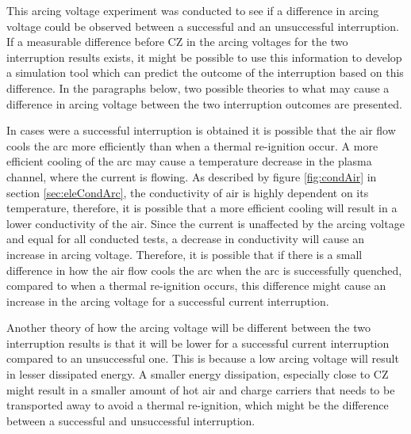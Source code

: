 \documentclass[10pt,b5paper,twoside]{article}
\begin{document}
This arcing voltage experiment was conducted to see if a difference in arcing voltage could be observed between a successful and an unsuccessful interruption. If a measurable difference before CZ in the arcing voltages for the two interruption results exists, it might be possible to use this information to develop a simulation tool which can predict the outcome of the interruption based on this difference. In the paragraphs below, two possible theories to what may cause a difference in arcing voltage between the two interruption outcomes are presented.

In cases were a successful interruption is obtained it is possible that the air flow cools the arc more efficiently than when a thermal re-ignition occur. A more efficient cooling of the arc may cause a temperature decrease in the plasma channel, where the current is flowing. As described by figure \ref{fig:condAir} in section \ref{sec:eleCondArc}, the conductivity of air is highly dependent on its temperature, therefore, it is possible that a more efficient cooling will result in a lower conductivity of the air. Since the current is unaffected by the arcing voltage and equal for all conducted tests, a decrease in conductivity will cause an increase in arcing voltage. Therefore, it is possible that if there is a small difference in how the air flow cools the arc when the arc is successfully quenched, compared to when a thermal re-ignition occurs, this difference might cause an increase in the arcing voltage for a successful current interruption.

Another theory of how the arcing voltage will be different between the two interruption results is that it will be lower for a successful current interruption compared to an unsuccessful one. This is because a low arcing voltage will result in lesser dissipated energy. A smaller energy dissipation, especially close to CZ might result in a smaller amount of hot air and charge carriers that needs to be transported away to avoid a thermal re-ignition, which might be the difference between a successful and unsuccessful interruption.
\end{document}
